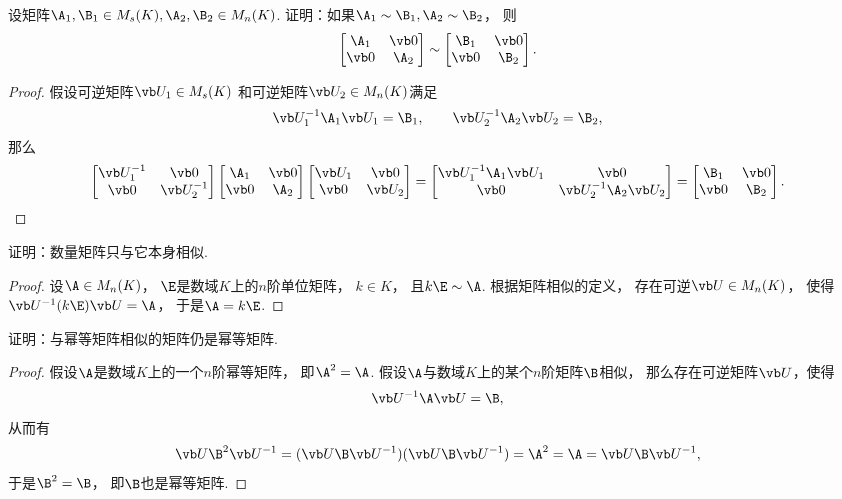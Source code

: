 \begin{example}\label{example:相似矩阵.分块对角矩阵的相似性}
设矩阵\(\A_1,\B_1 \in M_s(K),
\A_2,\B_2 \in M_n(K)\).
证明：如果\(\A_1 \sim \B_1,\A_2 \sim \B_2\)，
则\[
	\begin{bmatrix}
		\A_1 & \vb0 \\
		\vb0 & \A_2
	\end{bmatrix}
	\sim \begin{bmatrix}
		\B_1 & \vb0 \\
		\vb0 & \B_2
	\end{bmatrix}.
\]
\begin{proof}
假设可逆矩阵\(\P_1 \in M_s(K)\)
和可逆矩阵\(\P_2 \in M_n(K)\)满足\[
	\P_1^{-1} \A_1 \P_1 = \B_1,
	\qquad
	\P_2^{-1} \A_2 \P_2 = \B_2,
\]
那么\[
	\begin{bmatrix}
		\P_1^{-1} & \vb0 \\
		\vb0 & \P_2^{-1}
	\end{bmatrix}
	\begin{bmatrix}
		\A_1 & \vb0 \\
		\vb0 & \A_2
	\end{bmatrix}
	\begin{bmatrix}
		\P_1 & \vb0 \\
		\vb0 & \P_2
	\end{bmatrix}
	= \begin{bmatrix}
		\P_1^{-1} \A_1 \P_1 & \vb0 \\
		\vb0 & \P_2^{-1} \A_2 \P_2
	\end{bmatrix}
	= \begin{bmatrix}
		\B_1 & \vb0 \\
		\vb0 & \B_2
	\end{bmatrix}.
	\qedhere
\]
\end{proof}
\end{example}
\begin{example}
证明：数量矩阵只与它本身相似.
\begin{proof}
设\(\A \in M_n(K)\)，
\(\E\)是数域\(K\)上的\(n\)阶单位矩阵，
\(k \in K\)，
且\(k\E \sim \A\).
根据矩阵相似的定义，
存在可逆\(\P \in M_n(K)\)，
使得\(\P^{-1} (k\E) \P = \A\)，
于是\(\A = k\E\).
\end{proof}
\end{example}
\begin{example}\label{example:幂等矩阵.幂等矩阵的相似类}
证明：与幂等矩阵相似的矩阵仍是幂等矩阵.
\begin{proof}
假设\(\A\)是数域\(K\)上的一个\(n\)阶幂等矩阵，
即\(\A^2=\A\).
假设\(\A\)与数域\(K\)上的某个\(n\)阶矩阵\(\B\)相似，
那么存在可逆矩阵\(\P\)，使得\[
	\P^{-1}\A\P = \B,
\]
从而有\[
	\P\B^2\P^{-1}
	= (\P\B\P^{-1})(\P\B\P^{-1})
	= \A^2
	= \A
	= \P\B\P^{-1},
\]
于是\(\B^2=\B\)，
即\(\B\)也是幂等矩阵.
\end{proof}
\end{example}
